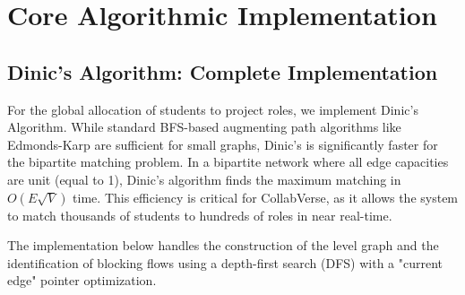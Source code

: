 \documentclass[12pt,a4paper]{article}
\begin{document}
\section{Core Algorithmic Implementation}

\subsection{Dinic's Algorithm: Complete Implementation}

For the global allocation of students to project roles, we implement Dinic's Algorithm. While standard BFS-based augmenting path algorithms like Edmonds-Karp are sufficient for small graphs, Dinic's is significantly faster for the bipartite matching problem. In a bipartite network where all edge capacities are unit (equal to 1), Dinic's algorithm finds the maximum matching in $O(E\sqrt{V})$ time. This efficiency is critical for CollabVerse, as it allows the system to match thousands of students to hundreds of roles in near real-time.

The implementation below handles the construction of the level graph and the identification of blocking flows using a depth-first search (DFS) with a "current edge" pointer optimization.
\end{document}
